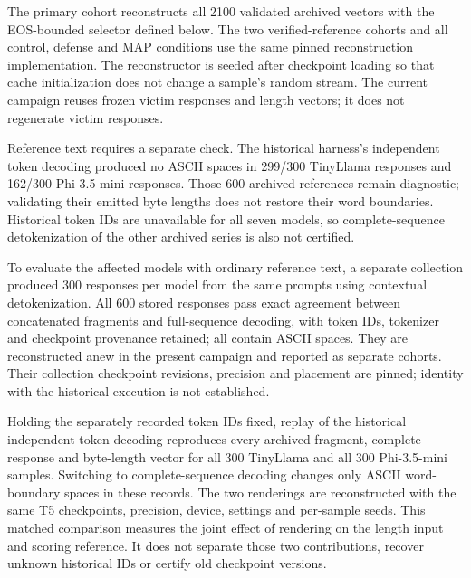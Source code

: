 \documentclass[electronics,article,submit,pdftex,moreauthors]{Definitions/mdpi}
\begin{document}
The primary cohort reconstructs all 2100 validated archived vectors with the EOS-bounded selector defined below. The two verified-reference cohorts and all control, defense and MAP conditions use the same pinned reconstruction implementation. The reconstructor is seeded after checkpoint loading so that cache initialization does not change a sample's random stream. The current campaign reuses frozen victim responses and length vectors; it does not regenerate victim responses.

Reference text requires a separate check. The historical harness's independent token decoding produced no ASCII spaces in 299/300 TinyLlama responses and 162/300 Phi-3.5-mini responses. Those 600 archived references remain diagnostic; validating their emitted byte lengths does not restore their word boundaries. Historical token IDs are unavailable for all seven models, so complete-sequence detokenization of the other archived series is also not certified.

To evaluate the affected models with ordinary reference text, a separate collection produced 300 responses per model from the same prompts using contextual detokenization. All 600 stored responses pass exact agreement between concatenated fragments and full-sequence decoding, with token IDs, tokenizer and checkpoint provenance retained; all contain ASCII spaces. They are reconstructed anew in the present campaign and reported as separate cohorts. Their collection checkpoint revisions, precision and placement are pinned; identity with the historical execution is not established.

Holding the separately recorded token IDs fixed, replay of the historical independent-token decoding reproduces every archived fragment, complete response and byte-length vector for all 300 TinyLlama and all 300 Phi-3.5-mini samples. Switching to complete-sequence decoding changes only ASCII word-boundary spaces in these records. The two renderings are reconstructed with the same T5 checkpoints, precision, device, settings and per-sample seeds. This matched comparison measures the joint effect of rendering on the length input and scoring reference. It does not separate those two contributions, recover unknown historical IDs or certify old checkpoint versions.
\end{document}
